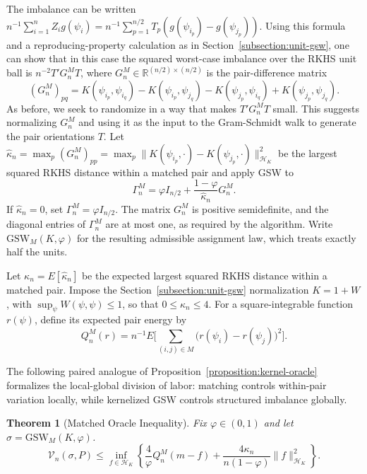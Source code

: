 \documentclass[letterpaper,12pt]{article}
\newtheorem{thm}{Theorem}[section]
\theoremstyle{definition}
\numberwithin{equation}{section}
\newcommand{\mr}{\mathbb{R}}
\newcommand{\mc}{\mathcal}
\newcommand{\norm}[1]{\lVert#1\rVert}
\begin{document}
The imbalance can be written $n^{-1}\sum_{i=1}^nZ_ig(\psi_i)=n^{-1}\sum_{p=1}^{n/2}T_p(g(\psi_{i_p})-g(\psi_{j_p}))$.
Using this formula and a reproducing-property calculation as in Section~\ref{subsection:unit-gsw}, one can show that in this case the squared worst-case imbalance over the RKHS unit ball is $n^{-2}T'G_n^MT$, where $G_n^M\in\mr^{(n/2)\times(n/2)}$ is the pair-difference matrix
\begin{equation}\label{equation:matched-pair-gram}
(G_n^M)_{pq}=K(\psi_{i_p},\psi_{i_q})-K(\psi_{i_p},\psi_{j_q})-K(\psi_{j_p},\psi_{i_q})+K(\psi_{j_p},\psi_{j_q}).
\end{equation}
As before, we seek to randomize in a way that makes $T'G_n^MT$ small.
This suggests normalizing $G_n^M$ and using it as the input to the Gram-Schmidt walk to generate the pair orientations $T$.
Let $\widehat\kappa_n=\max_p(G_n^M)_{pp}=\max_p\norm{K(\psi_{i_p},\cdot)-K(\psi_{j_p},\cdot)}_{\mc H_K}^2$ be the largest squared RKHS distance within a matched pair and apply GSW to
\begin{equation}\label{equation:matched-gsw-gram}
\Gamma_n^M=\varphi I_{n/2}+\frac{1-\varphi}{\widehat\kappa_n}G_n^M.
\end{equation}
If $\widehat\kappa_n=0$, set $\Gamma_n^M=\varphi I_{n/2}$.
The matrix $G_n^M$ is positive semidefinite, and the diagonal entries of $\Gamma_n^M$ are at most one, as required by the algorithm.
Write $\mathrm{GSW}_M(K,\varphi)$ for the resulting admissible assignment law, which treats exactly half the units.

Let $\kappa_n=E[\widehat\kappa_n]$ be the expected largest squared RKHS distance within a matched pair.
Impose the Section~\ref{subsection:unit-gsw} normalization $K=1+W$, with $\sup_\psi W(\psi,\psi)\leq1$, so that $0\leq\kappa_n\leq4$.
For a square-integrable function $r(\psi)$, define its expected pair energy by
\begin{equation}\label{equation:matched-pair-energy}
Q_n^M(r)=n^{-1}E\bigg[\sum_{(i,j)\in M}\bigl(r(\psi_i)-r(\psi_j)\bigr)^2\bigg].
\end{equation}

The following paired analogue of Proposition~\ref{proposition:kernel-oracle} formalizes the local-global division of labor: matching controls within-pair variation locally, while kernelized GSW controls structured imbalance globally.

\begin{thm}[Matched Oracle Inequality]\label{thm:matched-gsw}
Fix $\varphi\in(0,1)$ and let $\sigma=\mathrm{GSW}_M(K,\varphi)$.
\begin{equation}\label{equation:matched-gsw-oracle}
\mc V_n(\sigma,P)\leq\inf_{f\in\mc H_K}\left\{\frac4\varphi Q_n^M(m-f)+\frac{4\kappa_n}{n(1-\varphi)}\norm{f}_{\mc H_K}^2\right\}.
\end{equation}
\end{thm}
\end{document}
